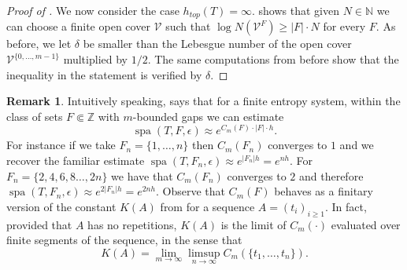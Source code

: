 \documentclass[a4paper,oneside]{amsart}
\renewcommand{\(}{\begin{dmath*}}
\renewcommand{\)}{\end{dmath*}}
\theoremstyle{definition}
\newtheorem{remark}{Remark}
\newcommand{\N}{\mathbb{N}}
\newcommand{\Z}{\mathbb{Z}}
\newcommand{\spa}{\operatorname{spa}}
\begin{document}
\begin{proof}[Proof of ]
We now consider the case $h_{top}(T)=\infty$.  shows that given $N\in\N$ we can choose a finite open cover $\mathcal V$ such that $\log N(\mathcal V^F)\geq |F|\cdot N$ for every $F$. As before, we let $\delta$ be smaller than the Lebesgue number of the open cover $\mathcal V^{\{0,\dots,m-1\}}$ multiplied by $1/2$. The same computations from before show that the inequality in the statement is verified by $\delta$. 
\end{proof}

\begin{remark} Intuitively speaking, 
 says that for a finite entropy system,  within the class of sets  $F\Subset\Z$ with $m$-bounded gaps  we can estimate \[\spa(T,F,\epsilon)\approx e^{C_m(F)\cdot |F|\cdot h}.\]
For instance if we take $F_n=\{1,\dots,n\}$ then $C_m(F_n)$ converges to $1$ and we recover the familiar estimate $\spa(T,F_n,\epsilon)\approx e^{|F_n|h}= e^{nh}$. For $F_n=\{2,4,6,8\dots,2n\}$ we have that $C_m(F_n)$ converges to $2$ and therefore  $\spa(T,F_n,\epsilon)\approx e^{2|F_n|h}=e^{2nh}$. Observe that $C_m(F)$ behaves as a finitary version of the constant $K(A)$ from  for a sequence $A=(t_i)_{i\geq 1}$. In fact, provided that $A$ has no repetitions, $K(A)$ is the limit of $C_m(\cdot)$ evaluated over finite segments of the sequence, in the sense that \[K(A)=\lim_{m\to\infty}\limsup_{n\to\infty}C_m(\{t_1,\dots,t_n\}).\]
\end{remark}
\end{document}

